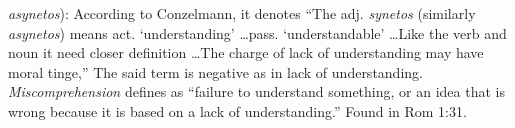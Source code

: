 \item[Miscomprehension,]

\textit{asynetos}):
According to Conzelmann, it denotes ``The adj. \emph{synetos} (similarly \emph{asynetos}) means act. `understanding' \ldots pass. `understandable' \ldots Like the verb and noun it need closer definition \ldots The charge of lack of understanding may have moral tinge,''  
The said term is negative as in lack of understanding. \emph{Miscomprehension} defines as ``failure to understand something, or an idea that is wrong because it is based on a lack of understanding.''
Found in Rom 1:31.
